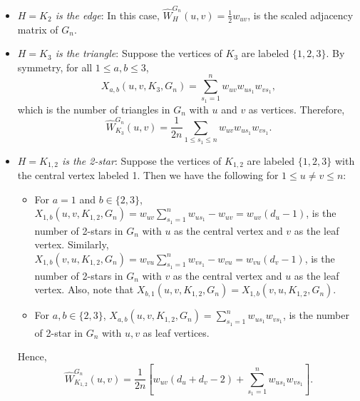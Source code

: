 \documentclass[11pt,reqno]{amsart}
\numberwithin{equation}{section}
\theoremstyle{definition}
\begin{document}
\begin{itemize} 

\item {\it $H=K_2$ is the edge}: In this case, $\hat W^{G_n}_{H}(u, v) = \frac{1}{2} w_{uv} $, is the scaled adjacency matrix of $G_n$. 

\item {\it $H=K_3$ is the triangle}: Suppose the vertices of $K_3$ are 
labeled $\{ 1, 2, 3\}$. By symmetry, for all $1 \leq a, b \leq 3$, $$X_{a, b}(u, v, K_3, G_n) = \sum_{s_1=1}^n w_{u v}  w_{u s_1}w_{v s_1},$$ which is the number of triangles in $G_n$ with $u$ and $v$ as vertices. Therefore,  
$$\hat W^{G_n}_{K_3}(u, v)  = \frac{1}{2 n} \sum_{1 \leq s_1 \leq n} w_{u v}  w_{u s_1}w_{v s_1} .$$

\item {\it $H=K_{1, 2}$ is the 2-star}: Suppose the vertices of $K_{1, 2}$ are labeled $\{ 1, 2, 3\}$ with the central vertex labeled 1. Then we have the following for $1 \leq u \ne v \leq n$: 

\begin{itemize}

\item For $a=1$ and $b \in \{2, 3\}$, $X_{1, b}(u, v, K_{1, 2}, G_n) = w_{u v} \sum_{s_1 = 1}^n  w_{u s_1} - w_{uv} = w_{uv}(d_u-1)$, is the number of 2-stars in $G_n$ with $u$ as the central vertex and $v$ as the leaf vertex. Similarly, $X_{1, b}(v, u, K_{1, 2}, G_n) = w_{v u} \sum_{s_1 = 1}^n  w_{v s_1} - w_{vu} = w_{vu}(d_v-1)$, is the number of 2-stars in $G_n$ with $v$ as the central vertex and $u$ as the leaf vertex. Also, note that $X_{b, 1}(u, v, K_{1, 2}, G_n) = X_{1, b}(v, u, K_{1, 2}, G_n)$. 


\item For $a, b \in \{2, 3\}$, $X_{a, b}(u, v, K_{1, 2}, G_n) = \sum_{s_1=1}^n w_{u s_1} w_{v s_1}$,  is the number of 2-star in $G_n$ with $u, v$ as leaf vertices. 

\end{itemize} 
Hence, 
$$\hat W^{G_n}_{K_{1, 2}} (u, v) = \frac{1}{2n} \left[ w_{u v} \left(d_u + d_v - 2\right) + \sum_{s_1=1}^n w_{u s_1} w_{v s_1}  \right].$$ 

\end{itemize}
\end{document}
